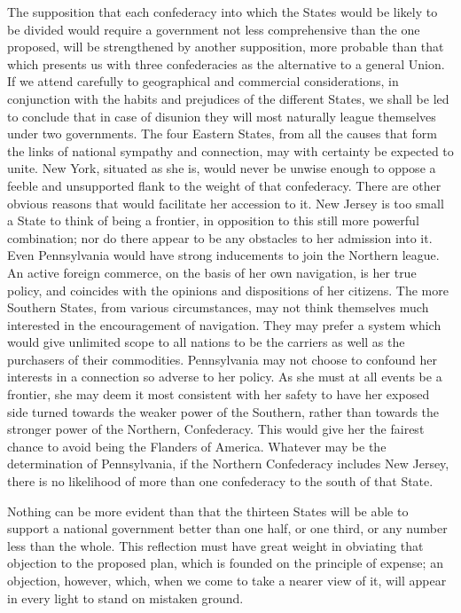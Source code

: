 The supposition that each confederacy into which the States would be likely to be divided would require a government not less comprehensive than the one proposed, will be strengthened by another supposition, more probable than that which presents us with three confederacies as the alternative to a general Union. 
If we attend carefully to geographical and commercial considerations, in conjunction with the habits and prejudices of the different States, we shall be led to conclude that in case of disunion they will most naturally league themselves under two governments. 
The four Eastern States, from all the causes that form the links of national sympathy and connection, may with certainty be expected to unite. 
New York, situated as she is, would never be unwise enough to oppose a feeble and unsupported flank to the weight of that confederacy. 
There are other obvious reasons that would facilitate her accession to it. 
New Jersey is too small a State to think of being a frontier, in opposition to this still more powerful combination; nor do there appear to be any obstacles to her admission into it. 
Even Pennsylvania would have strong inducements to join the Northern league. 
An active foreign commerce, on the basis of her own navigation, is her true policy, and coincides with the opinions and dispositions of her citizens. 
The more Southern States, from various circumstances, may not think themselves much interested in the encouragement of navigation. 
They may prefer a system which would give unlimited scope to all nations to be the carriers as well as the purchasers of their commodities. 
Pennsylvania may not choose to confound her interests in a connection so adverse to her policy. 
As she must at all events be a frontier, she may deem it most consistent with her safety to have her exposed side turned towards the weaker power of the Southern, rather than towards the stronger power of the Northern, Confederacy. 
This would give her the fairest chance to avoid being the Flanders of America. 
Whatever may be the determination of Pennsylvania, if the Northern Confederacy includes New Jersey, there is no likelihood of more than one confederacy to the south of that State.

Nothing can be more evident than that the thirteen States will be able to support a national government better than one half, or one third, or any number less than the whole. 
This reflection must have great weight in obviating that objection to the proposed plan, which is founded on the principle of expense; an objection, however, which, when we come to take a nearer view of it, will appear in every light to stand on mistaken ground.

